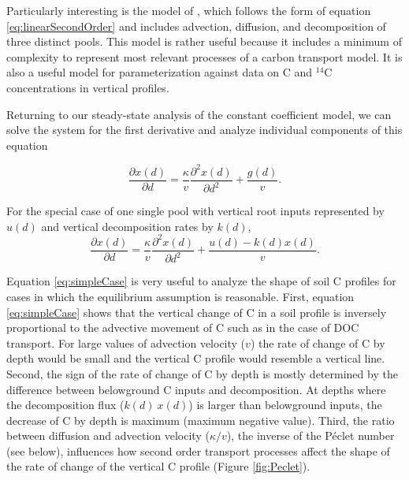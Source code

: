 \documentclass[11pt, oneside, a4paper]{article}   	%
\begin{document}
\begin{landscape}
\end{landscape}

Particularly interesting is the model of \citet{Elzein1995}, which follows the form of equation \ref{eq:linearSecondOrder} and includes advection, diffusion, and decomposition of three distinct pools. This model is rather useful because it includes a minimum of complexity to represent most relevant processes of a carbon transport model. It is also a useful model for parameterization against data on C and $^{14}$C concentrations in vertical profiles. 

Returning to our steady-state analysis of the constant coefficient model, we can solve the system for the first derivative and analyze individual components of this equation

\begin{equation} \label{eq:firstDeriv}
\frac{\partial x(d)}{\partial d} = \frac{\kappa}{v} \frac{\partial^2 x(d)}{\partial d^2} + \frac{g(d)}{v}.
\end{equation}

For the special case of one single pool with vertical root inputs represented by $u(d)$ and vertical decomposition rates by $k(d)$,
\begin{equation} \label{eq:simpleCase}
\frac{\partial x(d)}{\partial d} = \frac{\kappa}{v} \frac{\partial^2 x(d)}{\partial d^2} + \frac{u(d) - k(d) x(d)}{v}.
\end{equation}

Equation \ref{eq:simpleCase} is very useful to analyze the shape of soil C profiles for cases in which the equilibrium assumption is reasonable. 
First, equation \ref{eq:simpleCase} shows that the vertical change of C in a soil profile is inversely proportional to the advective movement of C such as in the case of DOC transport. For large values of advection velocity ($v$) the rate of change of C by depth would be small and the vertical C profile would resemble a vertical line. Second, the sign of the rate of change of C by depth is mostly determined by the difference between belowground C inputs and decomposition. At depths where the decomposition flux ($k(d) \ x(d)$) is larger than belowground inputs, the decrease of C by depth is maximum (maximum negative value). Third, the ratio between diffusion and advection velocity ($\kappa / v$), the inverse of the Péclet number (see below), influences how second order transport processes affect the shape of the rate of change of the vertical C profile (Figure \ref{fig:Peclet}). 
\end{document}
